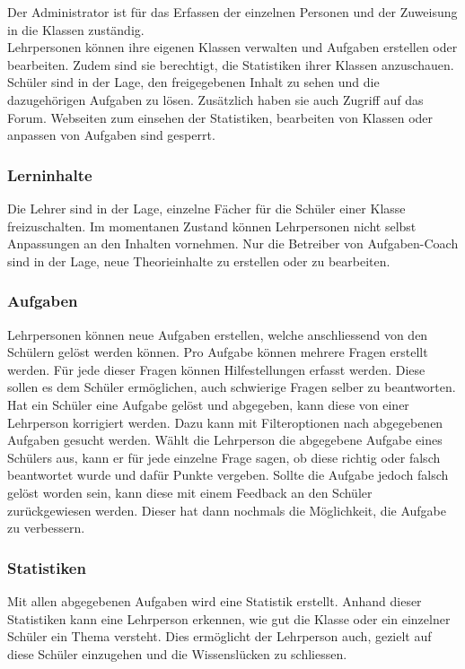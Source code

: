 Der Administrator ist für das Erfassen der einzelnen Personen und der Zuweisung in die Klassen zuständig. \\

Lehrpersonen können ihre eigenen Klassen verwalten und Aufgaben erstellen oder bearbeiten. Zudem sind sie berechtigt, die Statistiken ihrer Klassen anzuschauen. \\

Schüler sind in der Lage, den freigegebenen Inhalt zu sehen und die dazugehörigen Aufgaben zu lösen. Zusätzlich haben sie auch Zugriff auf das Forum. Webseiten zum einsehen der Statistiken, bearbeiten von Klassen oder anpassen von Aufgaben sind gesperrt.

\subsubsection*{Lerninhalte}
Die Lehrer sind in der Lage, einzelne Fächer für die Schüler einer Klasse freizuschalten. Im momentanen Zustand können Lehrpersonen nicht selbst Anpassungen an den Inhalten vornehmen. Nur die Betreiber von Aufgaben-Coach sind in der Lage, neue Theorieinhalte zu erstellen oder zu bearbeiten.

\subsubsection*{Aufgaben}
Lehrpersonen können neue Aufgaben erstellen, welche anschliessend von den Schülern gelöst werden können. Pro Aufgabe können mehrere Fragen erstellt werden. Für jede dieser Fragen können Hilfestellungen erfasst werden. Diese sollen es dem Schüler ermöglichen, auch schwierige Fragen selber zu beantworten. \\

Hat ein Schüler eine Aufgabe gelöst und abgegeben, kann diese von einer Lehrperson korrigiert werden. Dazu kann mit Filteroptionen nach abgegebenen Aufgaben gesucht werden. Wählt die Lehrperson die abgegebene Aufgabe eines Schülers aus, kann er für jede einzelne Frage sagen, ob diese richtig oder falsch beantwortet wurde und dafür Punkte vergeben. Sollte die Aufgabe jedoch falsch gelöst worden sein, kann diese mit einem Feedback an den Schüler zurückgewiesen werden. Dieser hat dann nochmals die Möglichkeit, die Aufgabe zu verbessern. 

\subsubsection*{Statistiken}
Mit allen abgegebenen Aufgaben wird eine Statistik erstellt. Anhand dieser Statistiken kann eine Lehrperson erkennen, wie gut die Klasse oder ein einzelner Schüler ein Thema versteht. Dies ermöglicht der Lehrperson auch, gezielt auf diese Schüler einzugehen und die Wissenslücken zu schliessen.


